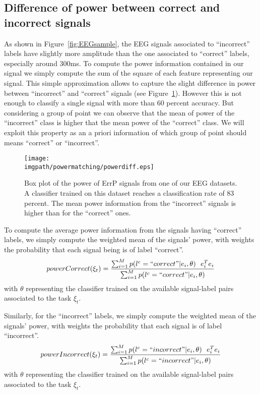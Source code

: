 \subsection{Difference of power between correct and incorrect signals}

As shown in Figure~\ref{fig:EEGsample}, the EEG signals associated to ``incorrect'' labels have slightly more amplitude than the one associated to ``correct'' labels, especially around 300ms. To compute the power information contained in our signal we simply compute the sum of the square of each feature representing our signal. This simple approximation allows to capture the slight difference in power between ``incorrect'' and ``correct'' signals (see Figure~\ref{fig:EEGpower}). However this is not enough to classify a single signal with more than 60 percent accuracy. But considering a group of point we can observe that the mean of power of the ``incorrect'' class is higher that the mean power of the ``correct'' class. We will exploit this property as an a priori information of which group of point should means ``correct'' or ``incorrect''.

\begin{figure}[!htbp]
\centering
\texttt{[image: \\imgpath/powermatching/powerdiff.eps]}
\caption{Box plot of the power of ErrP signals from one of our EEG datasets. A classifier trained on this dataset reaches a classification rate of 83 percent. The mean power information from the ``incorrect'' signals is higher than for the ``correct'' ones.}
\label{fig:EEGpower}
\end{figure} 

\visuopti{\newpage}

To compute the average power information from the signals having ``correct'' labels, we simply compute the weighted mean of the signals' power, with weights the probability that each signal  being is of label ``correct''.
\begin{eqnarray}
powerCorrect(\xi_t) = \frac{\sum_{i = 1}^{M} p(l^c = ``correct"| e_i , \theta) ~~ e_i^T e_i}{\sum_{i = 1}^{M} p(l^c = ``correct"| e_i , \theta)}
\label{eq:powerCorrect}
\end{eqnarray}
with $\theta$ representing the classifier trained on the available signal-label pairs associated to the task $\xi_t$.

Similarly, for the ``incorrect'' labels, we simply compute the weighted mean of the signals' power, with weights the probability that each signal is of label ``incorrect''. 
\begin{eqnarray}
powerIncorrect(\xi_t) = \frac{\sum_{i = 1}^{M} p(l^c = ``incorrect"| e_i , \theta) ~~ e_i^T e_i}{\sum_{i = 1}^{M} p(l^c = ``incorrect"| e_i , \theta)}
\label{eq:powerIncorrect}
\end{eqnarray}
with $\theta$ representing the classifier trained on the available signal-label pairs associated to the task $\xi_t$.

